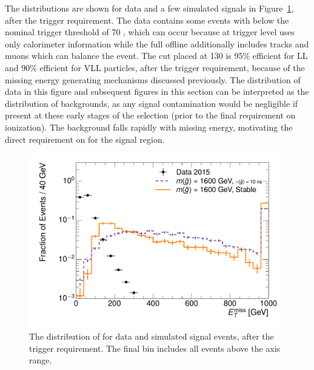 The \met distributions are shown for data and a few simulated signals in Figure~\ref{fig:nm1_met}, after the trigger requirement.
The data contains some events with \met below the nominal trigger threshold of 70 \GeV, which can occur because \met at trigger level uses only calorimeter information while the full offline \met additionally includes tracks and muons which can balance the event.
The cut placed at 130 \GeV is 95\% efficient for \ac{LL} and 90\% efficient for \ac{VLL} particles, after the trigger requirement, because of the missing energy generating mechanisms discussed previously.
The distribution of data in this figure and subsequent figures in this section can be interpreted as the distribution of backgrounds, as any signal contamination would be negligible if present at these early stages of the selection (prior to the final requirement on ionization). 
The background falls rapidly with missing energy, motivating the direct requirement on \met for the signal region.

\begin{figure}[h]
\centering
\includegraphics[width=\fullfig]{figures/selection_met_nm1_log.pdf}
\caption{The distribution of \met for data and simulated signal events, after the trigger requirement. The final bin includes all events above the axis range.}
\label{fig:nm1_met}
\end{figure}

